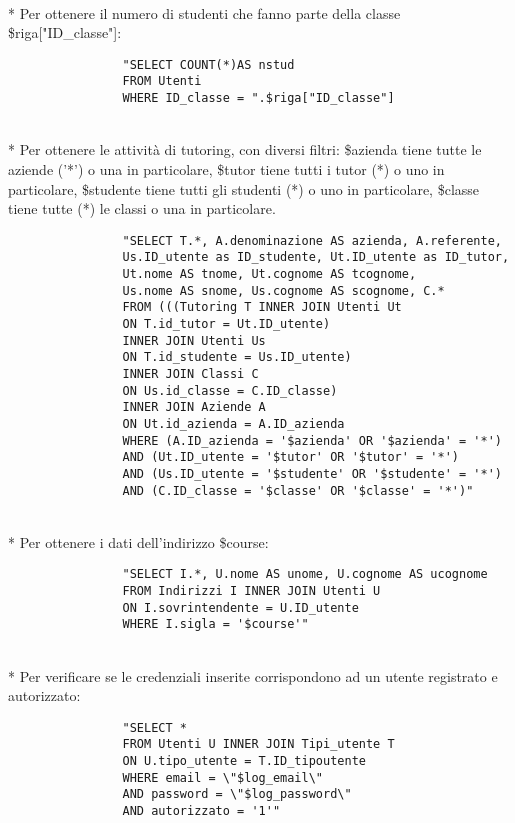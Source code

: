 \documentclass[12pt]{article}
\begin{document}
\\*
\noindent
Per ottenere il numero di studenti che fanno parte della classe \$riga["ID\_classe"]:
\begin{verbatim}
                "SELECT COUNT(*)AS nstud 
                FROM Utenti 
                WHERE ID_classe = ".$riga["ID_classe"]
\end{verbatim}  

\\*
\noindent
Per ottenere le attività di tutoring, con diversi filtri: \$azienda tiene tutte le aziende ('*') o una in particolare, \$tutor tiene tutti i tutor (*) o uno in particolare, \$studente tiene tutti gli studenti (*) o uno in particolare, \$classe tiene tutte (*) le classi o una in particolare.
\begin{verbatim}
                "SELECT T.*, A.denominazione AS azienda, A.referente,
                Us.ID_utente as ID_studente, Ut.ID_utente as ID_tutor,
                Ut.nome AS tnome, Ut.cognome AS tcognome,
                Us.nome AS snome, Us.cognome AS scognome, C.*
                FROM (((Tutoring T INNER JOIN Utenti Ut 
                ON T.id_tutor = Ut.ID_utente)
                INNER JOIN Utenti Us 
                ON T.id_studente = Us.ID_utente)
                INNER JOIN Classi C
                ON Us.id_classe = C.ID_classe)
                INNER JOIN Aziende A
                ON Ut.id_azienda = A.ID_azienda
                WHERE (A.ID_azienda = '$azienda' OR '$azienda' = '*')
                AND (Ut.ID_utente = '$tutor' OR '$tutor' = '*')
                AND (Us.ID_utente = '$studente' OR '$studente' = '*')
                AND (C.ID_classe = '$classe' OR '$classe' = '*')"
\end{verbatim}

\\*
\noindent
Per ottenere i dati dell'indirizzo \$course:
\begin{verbatim}
                "SELECT I.*, U.nome AS unome, U.cognome AS ucognome 
                FROM Indirizzi I INNER JOIN Utenti U 
                ON I.sovrintendente = U.ID_utente 
                WHERE I.sigla = '$course'"
\end{verbatim}  

\\*
\newpage
\noindent
Per verificare se le credenziali inserite corrispondono ad un utente registrato e autorizzato:
\begin{verbatim}
                "SELECT * 
                FROM Utenti U INNER JOIN Tipi_utente T
                ON U.tipo_utente = T.ID_tipoutente
                WHERE email = \"$log_email\"
                AND password = \"$log_password\"
                AND autorizzato = '1'"
\end{verbatim}
\end{document}
